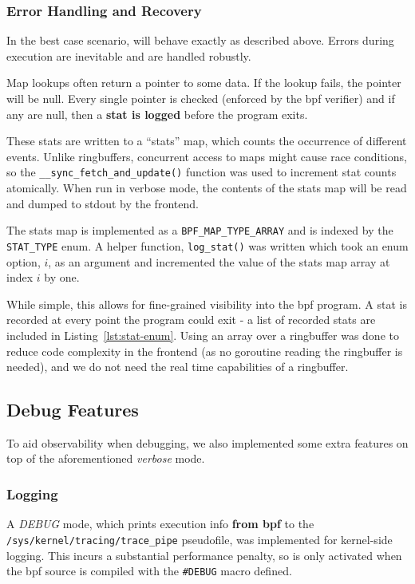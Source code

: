 \subsubsection{Error Handling and Recovery}\label{subsubsec:err-handling}

In the best case scenario, \af will behave exactly as described above. Errors
during execution are inevitable and are handled robustly. 

Map lookups often return a pointer to some data. If the lookup fails, the
pointer will be null. Every single pointer is checked (enforced by the \ac{bpf}
verifier) and if any are null, then a \textbf{stat is logged} before the program
exits.

These stats are written to a ``stats'' map, which counts the occurrence of
different events. Unlike ringbuffers, concurrent access to maps might cause race
conditions, so the \texttt{\_\_sync\_fetch\_and\_update()} function was used to
increment stat counts atomically. When run in verbose mode, the contents of the
stats map will be read and dumped to \ac{stdout} by the frontend.

The stats map is implemented as a \texttt{BPF\_MAP\_TYPE\_ARRAY} and is indexed
by the \texttt{STAT\_TYPE} enum. A helper function, \texttt{log\_stat()} was
written which took an enum option, $i$, as an argument and incremented the value
of the stats map array at index $i$ by one.

While simple, this allows for fine-grained visibility into the \ac{bpf} program.
A stat is recorded at every point the program could exit - a list of recorded
stats are included in Listing~\ref{lst:stat-enum}. Using an array over a
ringbuffer was done to reduce code complexity in the frontend (as no goroutine
reading the ringbuffer is needed), and we do not need the real time capabilities
of a ringbuffer.

\subsection{Debug Features}

To aid observability when debugging, we also implemented some extra features
on top of the aforementioned \textit{verbose} mode.

\subsubsection{Logging}

A \textit{DEBUG} mode,
which prints execution info \textbf{from \ac{bpf}} to the
\texttt{/sys/kernel/tracing/trace\_pipe} pseudofile, was implemented for
kernel-side logging. This incurs a substantial performance penalty, so is only
activated when the \ac{bpf} source is compiled with the \texttt{\#DEBUG} macro
defined.

